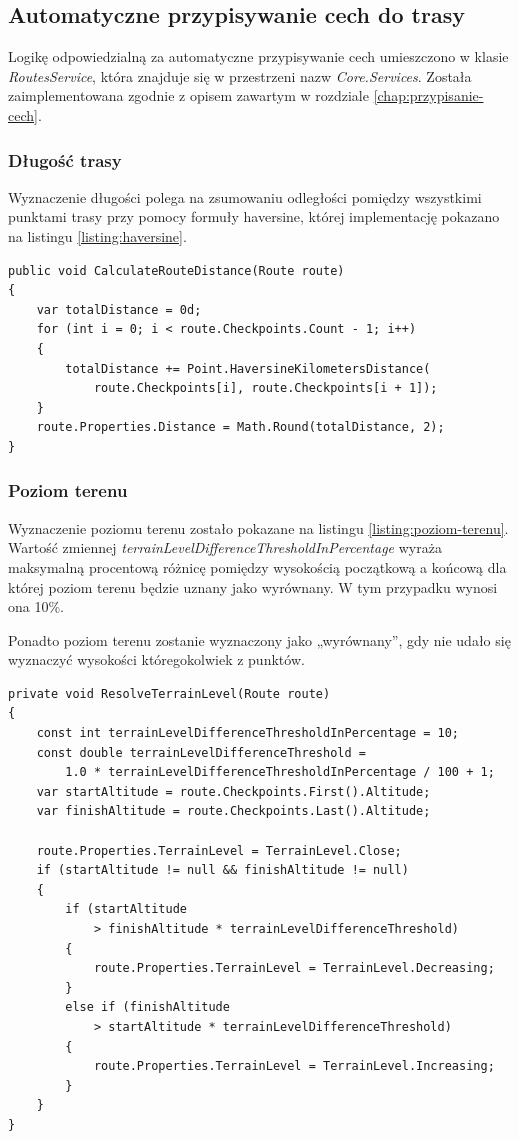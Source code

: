 \subsection{Automatyczne przypisywanie cech do trasy}
Logikę odpowiedzialną za automatyczne przypisywanie cech umieszczono w klasie \textit{RoutesService}, która znajduje się w przestrzeni nazw \textit{Core.Services}. Została zaimplementowana zgodnie z opisem zawartym w rozdziale \ref{chap:przypisanie-cech}.
\subsubsection{Długość trasy}
Wyznaczenie długości polega na zsumowaniu odległości pomiędzy wszystkimi punktami trasy przy pomocy formuły haversine, której implementację pokazano na listingu \ref{listing:haversine}.
\begin{lstlisting}[caption={Wyznaczenie długości trasy},label=listing:dlugosc-trasy]
public void CalculateRouteDistance(Route route)
{
    var totalDistance = 0d;
    for (int i = 0; i < route.Checkpoints.Count - 1; i++)
    {
        totalDistance += Point.HaversineKilometersDistance(
        	route.Checkpoints[i], route.Checkpoints[i + 1]);
    }
    route.Properties.Distance = Math.Round(totalDistance, 2);
}
\end{lstlisting}
\subsubsection{Poziom terenu}
Wyznaczenie poziomu terenu zostało pokazane na listingu \ref{listing:poziom-terenu}. Wartość zmiennej \textit{terrainLevelDifferenceThresholdInPercentage} wyraża maksymalną procentową różnicę pomiędzy wysokością początkową a końcową dla której poziom terenu będzie uznany jako wyrównany. W tym przypadku wynosi ona 10\%.

Ponadto poziom terenu zostanie wyznaczony jako „wyrównany”, gdy nie udało się wyznaczyć wysokości któregokolwiek z punktów.
\begin{lstlisting}[caption={Wyznaczenie poziomu terenu},label=listing:poziom-terenu]
private void ResolveTerrainLevel(Route route)
{
    const int terrainLevelDifferenceThresholdInPercentage = 10;
    const double terrainLevelDifferenceThreshold =
    	1.0 * terrainLevelDifferenceThresholdInPercentage / 100 + 1;
    var startAltitude = route.Checkpoints.First().Altitude;
    var finishAltitude = route.Checkpoints.Last().Altitude;

    route.Properties.TerrainLevel = TerrainLevel.Close;
    if (startAltitude != null && finishAltitude != null)
    {
        if (startAltitude 
        	> finishAltitude * terrainLevelDifferenceThreshold)
        {
            route.Properties.TerrainLevel = TerrainLevel.Decreasing;
        }
        else if (finishAltitude 
        	> startAltitude * terrainLevelDifferenceThreshold)
        {
            route.Properties.TerrainLevel = TerrainLevel.Increasing;
        }
    }
}
\end{lstlisting}

